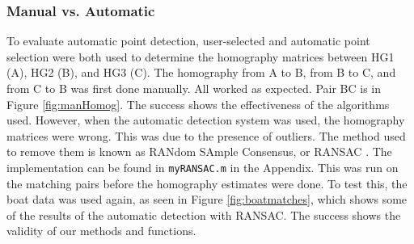 \documentclass[a4paper, 10pt, conference]{ieeeconf}
\begin{document}
\subsubsection{Manual vs. Automatic}
To evaluate automatic point detection, user-selected and automatic point selection were both used to determine the homography matrices between HG1 (A), HG2 (B), and HG3 (C). The homography from A to B, from B to C, and from C to B was first done manually. All worked as expected. Pair BC is in Figure \ref{fig:manHomog}. The success shows the effectiveness of the algorithms used. However, when the automatic detection system was used, the homography matrices were wrong. This was due to the presence of outliers. The method used to remove them is known as RANdom SAmple Consensus, or RANSAC \cite{ransac}. The implementation can be found in \texttt{myRANSAC.m} in the Appendix. This was run on the matching pairs before the homography estimates were done. To test this, the boat data was used again, as seen in Figure \ref{fig:boatmatches}, which shows some of the results of the automatic detection with RANSAC. The success shows the validity of our methods and functions.
\end{document}
